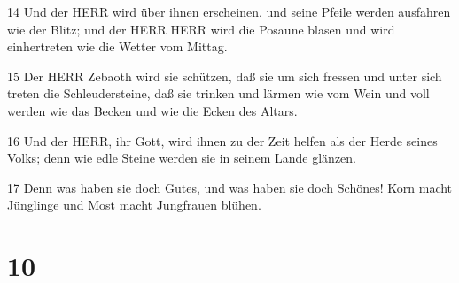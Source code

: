 \par 14 Und der HERR wird über ihnen erscheinen, und seine Pfeile werden ausfahren wie der Blitz; und der HERR HERR wird die Posaune blasen und wird einhertreten wie die Wetter vom Mittag.
\par 15 Der HERR Zebaoth wird sie schützen, daß sie um sich fressen und unter sich treten die Schleudersteine, daß sie trinken und lärmen wie vom Wein und voll werden wie das Becken und wie die Ecken des Altars.
\par 16 Und der HERR, ihr Gott, wird ihnen zu der Zeit helfen als der Herde seines Volks; denn wie edle Steine werden sie in seinem Lande glänzen.
\par 17 Denn was haben sie doch Gutes, und was haben sie doch Schönes! Korn macht Jünglinge und Most macht Jungfrauen blühen.

\chapter{10}

